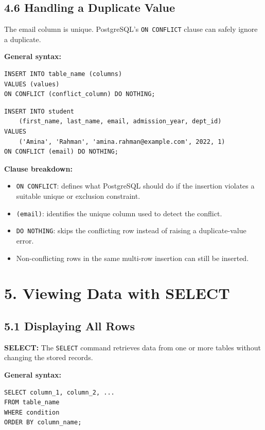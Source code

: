 \documentclass[12pt,a4paper]{article}
\newcommand{\defbox}[2]{%
  \vspace{0.2cm}
  \noindent\colorbox{boxgray}{\parbox{\dimexpr\linewidth-2\fboxsep}{%
    \textbf{#1:} #2
  }}
  \vspace{0.2cm}
}
\begin{document}
\subsection*{4.6 Handling a Duplicate Value}
The email column is unique. PostgreSQL's \texttt{ON CONFLICT} clause can safely ignore a duplicate.

\noindent\textbf{General syntax:}
\begin{verbatim}
INSERT INTO table_name (columns)
VALUES (values)
ON CONFLICT (conflict_column) DO NOTHING;
\end{verbatim}

\begin{verbatim}
INSERT INTO student
    (first_name, last_name, email, admission_year, dept_id)
VALUES
    ('Amina', 'Rahman', 'amina.rahman@example.com', 2022, 1)
ON CONFLICT (email) DO NOTHING;
\end{verbatim}

\noindent\textbf{Clause breakdown:}
\begin{itemize}
    \item \texttt{ON CONFLICT}: defines what PostgreSQL should do if the insertion violates a suitable unique or exclusion constraint.
    \item \texttt{(email)}: identifies the unique column used to detect the conflict.
    \item \texttt{DO NOTHING}: skips the conflicting row instead of raising a duplicate-value error.
    \item Non-conflicting rows in the same multi-row insertion can still be inserted.
\end{itemize}

\section*{5. Viewing Data with SELECT}

\subsection*{5.1 Displaying All Rows}
\defbox{SELECT}{The \texttt{SELECT} command retrieves data from one or more tables without changing the stored records.}

\noindent\textbf{General syntax:}
\begin{verbatim}
SELECT column_1, column_2, ...
FROM table_name
WHERE condition
ORDER BY column_name;
\end{verbatim}
\end{document}
